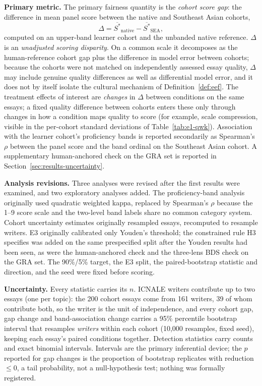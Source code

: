 \textbf{Primary metric.} The primary fairness quantity is the
\emph{cohort score gap}: the difference in mean panel score between
the native and Southeast Asian cohorts,
\begin{equation}
\Delta = \overline{S^{*}}_{\mathrm{native}}
        - \overline{S^{*}}_{\mathrm{SEA}},
\end{equation}
computed on an upper-band learner cohort and the unbanded native
reference. $\Delta$ is an \emph{unadjusted scoring disparity}. On a
common scale it decomposes as the human-reference cohort gap plus the
difference in model error between cohorts; because the cohorts were
not matched on independently assessed essay quality, $\Delta$ may
include genuine quality differences as well as differential model
error, and it does not by itself isolate the cultural mechanism of
Definition~\ref{def:eef}. The treatment effects of interest are
\emph{changes} in $\Delta$ between conditions on the same essays;
a fixed quality difference between cohorts enters these only through
changes in how a condition maps quality to score (for example, scale
compression, visible in the per-cohort standard deviations of
Table~\ref{tab:e1-qwk}).
Association with the learner cohort's proficiency bands is reported
secondarily as Spearman's $\rho$ between the panel score and the band
ordinal on the Southeast Asian cohort. A supplementary human-anchored
check on the GRA set is reported in
Section~\ref{sec:results-uncertainty}.

\textbf{Analysis revisions.} Three analyses were revised after the
first results were examined, and two exploratory analyses added.
The proficiency-band analysis originally used quadratic weighted
kappa, replaced by Spearman's $\rho$ because the 1--9 score scale
and the two-level band labels share no common category system.
Cohort uncertainty estimates originally resampled essays, recomputed
to resample writers. E3 originally calibrated only Youden's
threshold; the constrained rule H3 specifies was added on the same
prespecified split after the Youden results had been seen, as were
the human-anchored check and the three-lens BDS check on the GRA
set. The 90\%/5\% target, the E3 split, the paired-bootstrap
statistic and direction, and the seed were fixed before scoring.

\textbf{Uncertainty.} Every statistic carries its $n$. ICNALE
writers contribute up to two essays (one per topic): the 200 cohort
essays come from 161 writers, 39 of whom contribute both, so the
writer is the unit of independence, and every cohort gap, gap change
and band-association change carries a 95\% percentile bootstrap
interval that resamples \emph{writers} within each cohort (10{,}000
resamples, fixed seed), keeping each essay's paired conditions
together. Detection statistics carry counts and exact binomial intervals.
Intervals are the primary inferential device; the $p$ reported for
gap changes is the proportion of bootstrap replicates with reduction
$\le 0$, a tail probability, not a null-hypothesis test; nothing
was formally registered.
